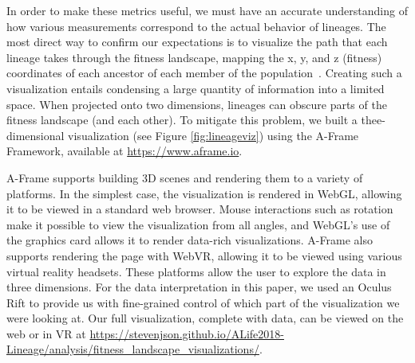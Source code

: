 \documentclass[letterpaper]{article}
\begin{document}

In order to make these metrics useful,
we must have an accurate understanding of how various measurements correspond to the actual behavior of lineages. The most direct way to confirm our expectations is to visualize the path that each lineage takes through the fitness landscape, mapping the x, y, and z (fitness) coordinates of each ancestor of each member of the population~\citep{virgo_lineage_2017}. Creating such a visualization entails condensing a large quantity of information into a limited space. When projected onto two dimensions, lineages can obscure parts of the fitness landscape (and each other). To mitigate this problem, we built a thee-dimensional visualization (see Figure \ref{fig:lineageviz}) using the A-Frame Framework, available at \url{https://www.aframe.io}.

A-Frame supports building %
3D scenes and rendering them to a variety of platforms. In the simplest case, the visualization is rendered in WebGL, allowing it to be viewed in a standard web browser. Mouse interactions such as rotation make it possible to view the visualization from all angles, and WebGL's use of the graphics card allows it to render data-rich visualizations. A-Frame also supports rendering the page with WebVR, allowing it to be viewed using various virtual reality headsets. These platforms allow the user to explore the data in %
three dimensions.
For the data interpretation in this paper, we used an Oculus Rift to provide us with fine-grained control of which part of the visualization we were looking at. Our full visualization, complete with data, can be viewed on the web or in VR at \url{https://stevenjson.github.io/ALife2018-Lineage/analysis/fitness_landscape_visualizations/}.
\end{document}

